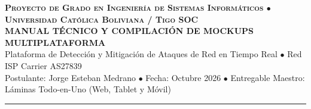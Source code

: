 \documentclass[11pt]{article}
\begin{document}
\pagecolor{bgdark}
\color{textprimary}
\pagestyle{empty}

\begin{center}
    {\large\scshape\bfseries\color{primary} Proyecto de Grado en Ingeniería de Sistemas Informáticos \quad $\bullet$ \quad Universidad Católica Boliviana / Tigo SOC}\\[4bp]
    {\LARGE\bfseries\color{textprimary} MANUAL TÉCNICO Y COMPILACIÓN DE MOCKUPS MULTIPLATAFORMA}\\[4bp]
    {\normalsize\color{textsecondary} Plataforma de Detección y Mitigación de Ataques de Red en Tiempo Real \quad $\bullet$ \quad Red ISP Carrier AS27839}\\[2bp]
    {\small\color{textmuted} Postulante: Jorge Esteban Medrano \quad $\bullet$ \quad Fecha: Octubre 2026 \quad $\bullet$ \quad Entregable Maestro: Láminas Todo-en-Uno (Web, Tablet y Móvil)}
\end{center}

\vspace{-4bp}
\noindent\textcolor{primary}{\rule{\textwidth}{1.5bp}}
\vspace{4bp}
\end{document}
